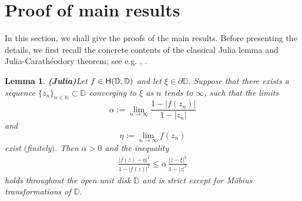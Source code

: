 \documentclass{amsart}
\newtheorem{lemma}[theorem]{Lemma}
\theoremstyle{definition}
\theoremstyle{remark}
\numberwithin{equation}{section}
\begin{document}
\section{Proof of main results}
In this section, we shall give the proofs of the main results. Before presenting the details, we first recall the concrete contents of the classical Julia lemma and Julia-Carath\'{e}odory theorem; see e.g. \cite{Abate, Sarason1}, \cite[p. 48 and p. 51]{Sarason2}.

\begin{lemma}{\bf(Julia)}\label{Julia}
Let $f\in {\rm{\textsf{H}}}(\mathbb D, \mathbb D)$ and let $\xi\in\partial \mathbb D$. Suppose that there exists a sequence $\{z_n\}_{n\in \mathbb N}\subset \mathbb D$ converging to $\xi$ as $n$ tends to $\infty$, such that the limits
$$\alpha:=\lim\limits_{n\rightarrow\infty}
\frac{1-|f(z_n)|}{1-|z_n|}$$
and
$$\eta:=\lim\limits_{n\rightarrow\infty}f(z_n)$$
exist $($finitely$)$. Then $\alpha>0$ and the  inequality
\begin{eqnarray}\label{ineq:Julia}
\frac{\big|f(z)-\eta\big|^2}{1-|f(z)|^2}\leq \alpha\,\frac{|z-\xi|^2}{1-|z|^2}
\end{eqnarray}
holds throughout the open unit disk $\mathbb D$ and is strict except for  M\"obius transformations of $\mathbb D$.
\end{lemma}
\end{document}
